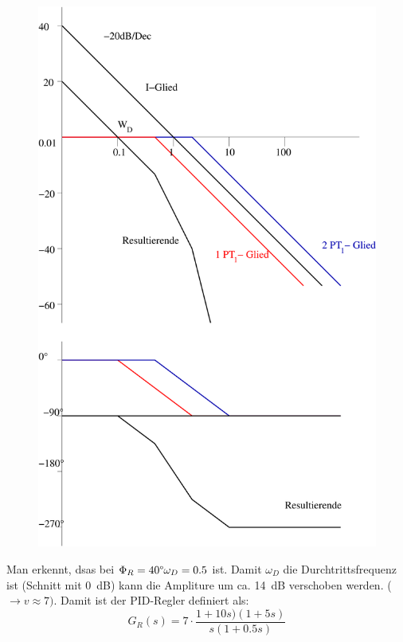 \documentclass[12pt,a4paper,ngerman]{scrartcl}
\begin{document}
\begin{figure}[H]
  \centering
  \includegraphics[width=.7\linewidth]{sysregel_bode_5-4}
\end{figure}
Man erkennt, dsas bei $\Phi_R=40\degree \omega_D=0.5$ ist. Damit $ \omega_D$ die Durchtrittsfrequenz ist (Schnitt mit 0~dB) kann die Ampliture um ca. 14~dB verschoben werden. ($\rightarrow v\approx 7)$. Damit ist der PID-Regler definiert als:
\[
G_R(s)=7\cdot \frac{1+10s)(1+5s)}{s(1+0.5s)}
\]
\end{document}

